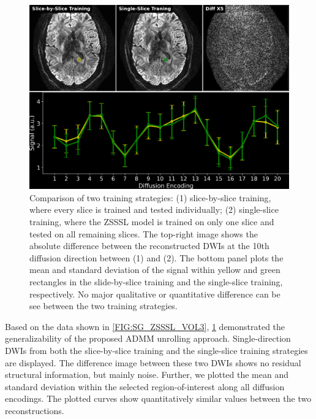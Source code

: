 \documentclass[journal,twoside,web]{ieeecolor}
\begin{document}
	\begin{figure}
		\begin{minipage}[c]{0.75\textwidth}
			\includegraphics[width=\textwidth]{../figures/fig7.png}
		\end{minipage}\hfill
		\begin{minipage}[c]{0.23\textwidth}
			\caption{Comparison of two training strategies: 
				(1) slice-by-slice training, 
				where every slice is trained and tested individually; 
				(2) single-slice training, 
				where the ZSSSL model is trained on only one slice 
				and tested on all remaining slices.
				The top-right image shows the absolute difference 
				between the reconstructed DWIs 
				at the 10th diffusion direction 
				between (1) and (2). 
				The bottom panel plots the mean and standard deviation 
				of the signal within yellow and green rectangles 
				in the slide-by-slice training and the single-slice training, 
				respectively. 
				No major qualitative or quantitative difference can be see 
				between the two training strategies.}
			\label{FIG:GENERALIZATION}
		\end{minipage}
	\end{figure}
	
	Based on the data shown in \cref{FIG:SG_ZSSSL_VOL3}, 
	\cref{FIG:GENERALIZATION} demonstrated the generalizability 
	of the proposed ADMM unrolling approach. 
	Single-direction DWIs from both the slice-by-slice training 
	and the single-slice training strategies are displayed. 
	The difference image between these two DWIs 
	shows no residual structural information, but mainly noise.
	Further, we plotted the mean and standard deviation 
	within the selected region-of-interest along all diffusion encodings.
	The plotted curves show quantitatively similar values 
	between the two reconstructions.
\end{document}
